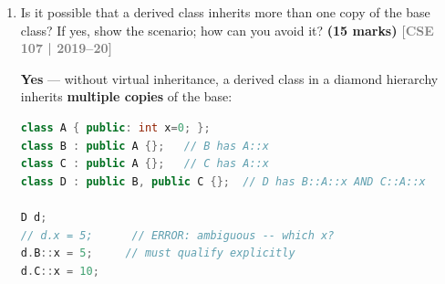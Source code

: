 \documentclass[12pt,a3paper]{article}
\newcommand{\yr}[1]{\hfill\textcolor{gray}{\small\textbf{[#1]}}}
\newcommand{\mk}[1]{\textcolor{orange!70!black}{\small\textbf{(#1 marks)}}}
\begin{document}
\begin{enumerate}
\begin{tcolorbox}
\begin{lstlisting}[language=C++]
class Base { public:
    Base() { cout<<"Base constructor\n"; }
    ~Base(){ cout<<"Base destructor\n";  }
};
class Mid : public Base { public:
    Mid()  { cout<<"Mid constructor\n"; }
    ~Mid() { cout<<"Mid destructor\n";  }
};
class Der : public Mid { public:
    Der()  { cout<<"Der constructor\n"; }
    ~Der() { cout<<"Der destructor\n";  }
};

int main(){ Der d; }
\end{lstlisting}

\textbf{Output:}
\begin{lstlisting}
Base constructor
Mid constructor
Der constructor
Der destructor
Mid destructor
Base destructor
\end{lstlisting}

\textbf{Multiple inheritance --- constructor order follows declaration:}

\begin{lstlisting}[language=C++]
class X { public: X(){cout<<"X\n";} ~X(){cout<<"~X\n";} };
class Y { public: Y(){cout<<"Y\n";} ~Y(){cout<<"~Y\n";} };
class Z : public X, public Y { public: Z(){cout<<"Z\n";} ~Z(){cout<<"~Z\n";} };
int main(){ Z z; }
// Output: X  Y  Z  ~Z  ~Y  ~X
\end{lstlisting}

\end{tcolorbox}


\item Is it possible that a derived class inherits more than one copy of the base class? If yes, show the scenario; how can you avoid it? \mk{15}
\yr{CSE 107 | 2019--20}

\begin{tcolorbox}[enhanced,breakable,ansbox,colback=cG!4,colframe=cG,
  boxrule=0.8pt,arc=5pt,
  title={\textbf{Answer --- Can a derived class inherit more than one copy of base? How to avoid?}},
  fonttitle=\bfseries\color{white},colbacktitle=cG]

\textbf{Yes} --- without virtual inheritance, a derived class in a
diamond hierarchy inherits \textbf{multiple copies} of the base:

\begin{lstlisting}[language=C++]
class A { public: int x=0; };
class B : public A {};   // B has A::x
class C : public A {};   // C has A::x
class D : public B, public C {};  // D has B::A::x AND C::A::x

D d;
// d.x = 5;      // ERROR: ambiguous -- which x?
d.B::x = 5;     // must qualify explicitly
d.C::x = 10;
\end{lstlisting}


\end{tcolorbox}
\end{enumerate}
\end{document}
